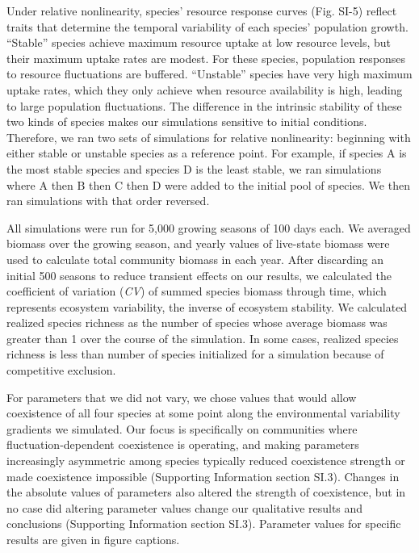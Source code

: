 \documentclass[12pt,]{article}
\begin{document}
Under relative nonlinearity, species' resource response curves (Fig.
SI-5) reflect traits that determine the temporal variability of each
species' population growth. ``Stable'' species achieve maximum resource
uptake at low resource levels, but their maximum uptake rates are
modest. For these species, population responses to resource fluctuations
are buffered. ``Unstable'' species have very high maximum uptake rates,
which they only achieve when resource availability is high, leading to
large population fluctuations. The difference in the intrinsic stability
of these two kinds of species makes our simulations sensitive to initial
conditions. Therefore, we ran two sets of simulations for relative
nonlinearity: beginning with either stable or unstable species as a
reference point. For example, if species A is the most stable species
and species D is the least stable, we ran simulations where A then B
then C then D were added to the initial pool of species. We then ran
simulations with that order reversed.

All simulations were run for 5,000 growing seasons of 100 days each. We
averaged biomass over the growing season, and yearly values of
live-state biomass were used to calculate total community biomass in
each year. After discarding an initial 500 seasons to reduce transient
effects on our results, we calculated the coefficient of variation
(\emph{CV}) of summed species biomass through time, which represents
ecosystem variability, the inverse of ecosystem stability. We calculated
realized species richness as the number of species whose average biomass
was greater than 1 over the course of the simulation. In some cases,
realized species richness is less than number of species initialized for
a simulation because of competitive exclusion.

For parameters that we did not vary, we chose values that would allow
coexistence of all four species at some point along the environmental
variability gradients we simulated. Our focus is specifically on
communities where fluctuation-dependent coexistence is operating, and
making parameters increasingly asymmetric among species typically
reduced coexistence strength or made coexistence impossible (Supporting
Information section SI.3). Changes in the absolute values of parameters
also altered the strength of coexistence, but in no case did altering
parameter values change our qualitative results and conclusions
(Supporting Information section SI.3). Parameter values for specific
results are given in figure captions.
\end{document}
